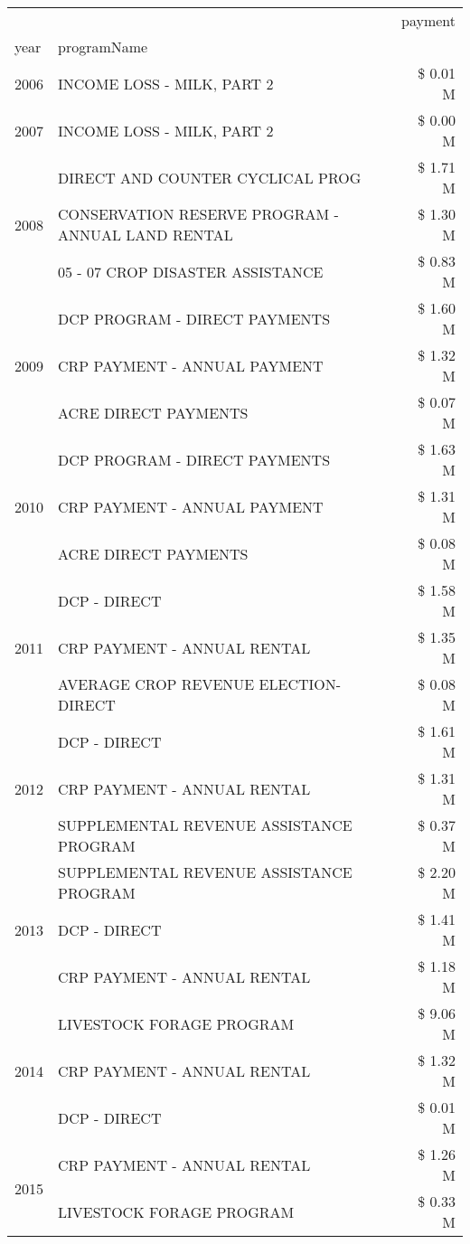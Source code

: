 \begin{tabular}{llr}
\toprule
 &  & payment \\
year & programName &  \\
\midrule
2006 & INCOME LOSS - MILK, PART 2 & \$ 0.01 M \\
\cline{1-3}
2007 & INCOME LOSS - MILK, PART 2 & \$ 0.00 M \\
\cline{1-3}
\multirow[t]{3}{*}{2008} & DIRECT AND COUNTER CYCLICAL PROG & \$ 1.71 M \\
 & CONSERVATION RESERVE PROGRAM - ANNUAL LAND RENTAL & \$ 1.30 M \\
 & 05 - 07 CROP DISASTER ASSISTANCE & \$ 0.83 M \\
\cline{1-3}
\multirow[t]{3}{*}{2009} & DCP PROGRAM - DIRECT PAYMENTS & \$ 1.60 M \\
 & CRP PAYMENT - ANNUAL PAYMENT & \$ 1.32 M \\
 & ACRE DIRECT PAYMENTS & \$ 0.07 M \\
\cline{1-3}
\multirow[t]{3}{*}{2010} & DCP PROGRAM - DIRECT PAYMENTS & \$ 1.63 M \\
 & CRP PAYMENT - ANNUAL PAYMENT & \$ 1.31 M \\
 & ACRE DIRECT PAYMENTS & \$ 0.08 M \\
\cline{1-3}
\multirow[t]{3}{*}{2011} & DCP - DIRECT & \$ 1.58 M \\
 & CRP PAYMENT - ANNUAL RENTAL & \$ 1.35 M \\
 & AVERAGE CROP REVENUE ELECTION-DIRECT & \$ 0.08 M \\
\cline{1-3}
\multirow[t]{3}{*}{2012} & DCP - DIRECT & \$ 1.61 M \\
 & CRP PAYMENT - ANNUAL RENTAL & \$ 1.31 M \\
 & SUPPLEMENTAL REVENUE ASSISTANCE PROGRAM & \$ 0.37 M \\
\cline{1-3}
\multirow[t]{3}{*}{2013} & SUPPLEMENTAL REVENUE ASSISTANCE PROGRAM & \$ 2.20 M \\
 & DCP - DIRECT & \$ 1.41 M \\
 & CRP PAYMENT - ANNUAL RENTAL & \$ 1.18 M \\
\cline{1-3}
\multirow[t]{3}{*}{2014} & LIVESTOCK FORAGE PROGRAM & \$ 9.06 M \\
 & CRP PAYMENT - ANNUAL RENTAL & \$ 1.32 M \\
 & DCP - DIRECT & \$ 0.01 M \\
\cline{1-3}
\multirow[t]{3}{*}{2015} & CRP PAYMENT - ANNUAL RENTAL & \$ 1.26 M \\
 & LIVESTOCK FORAGE PROGRAM & \$ 0.33 M \\

\end{tabular}
